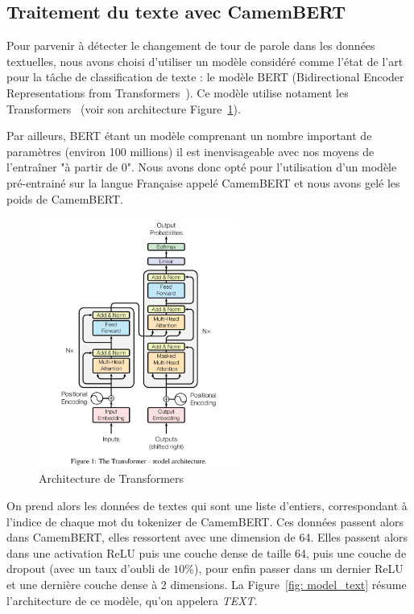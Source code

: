 \subsection{Traitement du texte avec CamemBERT}

Pour parvenir à détecter le changement de tour de parole dans les données textuelles, nous avons choisi d'utiliser un modèle
considéré comme l'état de l'art pour la tâche de classification de texte : le modèle BERT (Bidirectional Encoder
Representations from Transformers~\cite{Bert}). Ce modèle utilise notament les Transformers~\cite{transformers} 
(voir son architecture Figure~\ref{fig: Transformers}).

Par ailleurs, BERT étant un modèle comprenant un nombre important de paramètres (environ 100 millions) il est inenvisageable avec
nos moyens de l'entraîner "à partir de 0". Nous avons donc opté pour l'utilisation d'un modèle pré-entrainé sur la langue Française
appelé CamemBERT et nous avons gelé les poids de CamemBERT.

\begin{figure}[H]
    \centering
    \includegraphics[width=0.6\textwidth]{image_model/model_transformers.png}
    \caption{Architecture de Transformers}
    \label{fig: Transformers} 
\end{figure}



On prend alors les données de textes qui sont une liste d'entiers, correspondant 
à l'indice de chaque mot du tokenizer de CamemBERT. Ces données passent alors dans CamemBERT, elles ressortent avec une dimension de
64. Elles passent alors dans une activation ReLU puis une couche dense de taille 64, puis une couche de dropout (avec un taux
d'oubli de $10\%$), pour enfin passer dans un dernier ReLU et une dernière couche dense à 2 dimensions. 
La Figure~\ref{fig: model_text} résume l'architecture de ce modèle, qu'on appelera \textit{TEXT}.

